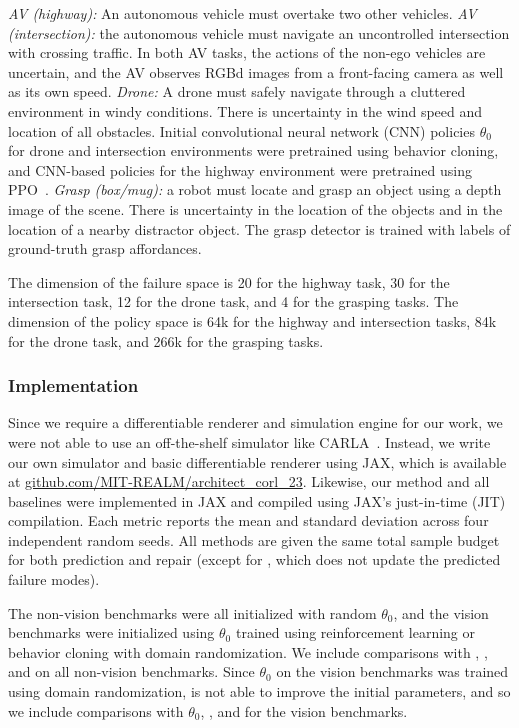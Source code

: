 \textit{AV (highway):} An autonomous vehicle must overtake two other vehicles.
%
\textit{AV (intersection):} the autonomous vehicle must navigate an uncontrolled intersection with crossing traffic.
%
In both AV tasks, the actions of the non-ego vehicles are uncertain, and the AV observes RGBd images from a front-facing camera as well as its own speed.
%
\textit{Drone:} A drone must safely navigate through a cluttered environment in windy conditions. There is uncertainty in the wind speed and location of all obstacles.
%
Initial convolutional neural network (CNN) policies $\theta_0$ for drone and intersection environments were pretrained using behavior cloning, and CNN-based policies for the highway environment were pretrained using PPO~\cite{schulmanProximalPolicyOptimization2017}.
%
\textit{Grasp (box/mug): } a robot must locate and grasp an object using a depth image of the scene. There is uncertainty in the location of the objects and in the location of a nearby distractor object. The grasp detector is trained with labels of ground-truth grasp affordances.

The dimension of the failure space is 20 for the highway task, 30 for the intersection task, 12 for the drone task, and 4 for the grasping tasks. The dimension of the policy space is 64k for the highway and intersection tasks, 84k for the drone task, and 266k for the grasping tasks.

\subsubsection{Implementation}

Since we require a differentiable renderer and simulation engine for our work, we were not able to use an off-the-shelf simulator like CARLA~\cite{Dosovitskiy17}. Instead, we write our own simulator and basic differentiable renderer using JAX, which is available at \url{github.com/MIT-REALM/architect_corl_23}.
%
Likewise, our method and all baselines were implemented in JAX and compiled using JAX's just-in-time (JIT) compilation. Each metric reports the mean and standard deviation across four independent random seeds. All methods are given the same total sample budget for both prediction and repair (except for \gdr, which does not update the predicted failure modes).

The non-vision benchmarks were all initialized with random $\theta_0$, and the vision benchmarks were initialized using $\theta_0$ trained using reinforcement learning or behavior cloning with domain randomization. We include comparisons with \gdr, \gda, and \ltc{} on all non-vision benchmarks. Since $\theta_0$ on the vision benchmarks was trained using domain randomization, \gdr{} is not able to improve the initial parameters, and so we include comparisons with $\theta_0$, \gda, and \ltc{} for the vision benchmarks.

